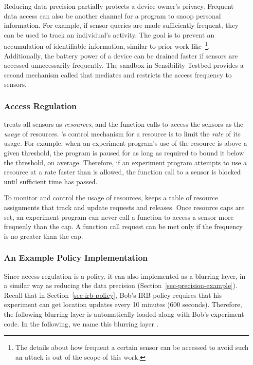Reducing data precision partially protects a device owner's privacy. Frequent data 
access can also be another channel for a program to snoop personal information.
For example, if sensor queries are made sufficiently frequent, they can be used
to track an individual's activity. The goal is to prevent an accumulation of identifiable 
information, similar to prior work like~\cite{gruteser2003anonymous}\footnote{The 
details about how frequent a certain sensor can be accessed to avoid such an 
attack is out of the scope of this work.}. 
Additionally, the battery power of a device can 
be drained faster if sensors are accessed
unnecessarily frequently. The sandbox in Sensibility Testbed provides a second mechanism
called  that mediates and restricts the access frequency to sensors. 

\subsubsection{Access Regulation}

 treats all sensors as \textit{resources}, and the function calls to 
access the sensors as the \textit{usage} of resources. 's control 
mechanism for a resource is to limit the \textit{rate} of its usage. For example, 
when an 
experiment program's use of the resource is above a given threshold, the 
program is paused for as long as required to bound it below the
threshold, on average. Therefore, if an experiment program attempts to 
use a resource at a rate faster than is allowed, the function 
call to a sensor is blocked until sufficient time has passed. 

To monitor and control the usage of resources,  keeps a 
table of resource assignments that track and update requests and releases. 
Once resource caps are set, an experiment program can never call a 
function to access a sensor more frequenly than the cap. A function call 
request can be met only if the frequency is no greater than the cap. 

\subsubsection{An Example Policy Implementation}\label{sec-rate-example}

Since access regulation is a policy, it can also implemented as a blurring layer, 
in a similar way as reducing the data precision (Section~\ref{sec-precision-example}).
Recall that in Section~\ref{sec-irb-policy}, Bob's IRB policy requires that
his experiment can get location updates every 10 minutes (600 seconds). 
Therefore, the following blurring layer is automatically loaded along with 
Bob's experiment code. In the following, we name this blurring layer 
.

